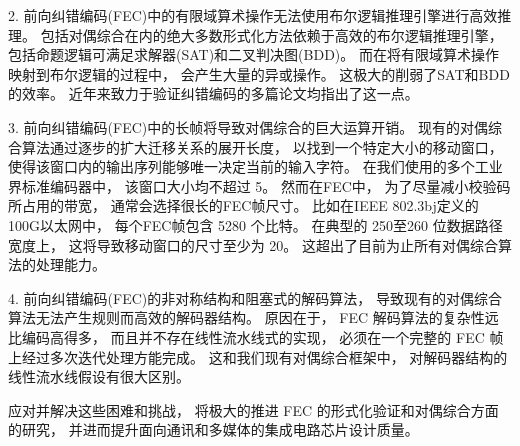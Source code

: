 2. 前向纠错编码(FEC)中的有限域算术操作无法使用布尔逻辑推理引擎进行高效推理。
包括对偶综合在内的绝大多数形式化方法依赖于高效的布尔逻辑推理引擎，
包括命题逻辑可满足求解器(SAT)和二叉判决图(BDD)。
而在将有限域算术操作映射到布尔逻辑的过程中，
会产生大量的异或操作。
这极大的削弱了SAT和BDD的效率。
近年来致力于验证纠错编码的多篇论文均指出了这一点。

3. 前向纠错编码(FEC)中的长帧将导致对偶综合的巨大运算开销。
现有的对偶综合算法通过逐步的扩大迁移关系的展开长度，
以找到一个特定大小的移动窗口，
使得该窗口内的输出序列能够唯一决定当前的输入字符。
在我们使用的多个工业界标准编码器中，
该窗口大小均不超过 5。
然而在FEC中，
为了尽量减小校验码所占用的带宽，
通常会选择很长的FEC帧尺寸。
比如在IEEE 802.3bj定义的 100G以太网中，
每个FEC帧包含 5280 个比特。
在典型的 250至260 位数据路径宽度上，
这将导致移动窗口的尺寸至少为 20。
这超出了目前为止所有对偶综合算法的处理能力。


4. 前向纠错编码(FEC)的非对称结构和阻塞式的解码算法，
导致现有的对偶综合算法无法产生规则而高效的解码器结构。
原因在于，
FEC 解码算法的复杂性远比编码高得多，
而且并不存在线性流水线式的实现，
必须在一个完整的 FEC 帧上经过多次迭代处理方能完成。
这和我们现有对偶综合框架中，
对解码器结构的线性流水线假设有很大区别。

应对并解决这些困难和挑战，
将极大的推进 FEC 的形式化验证和对偶综合方面的研究，
并进而提升面向通讯和多媒体的集成电路芯片设计质量。

